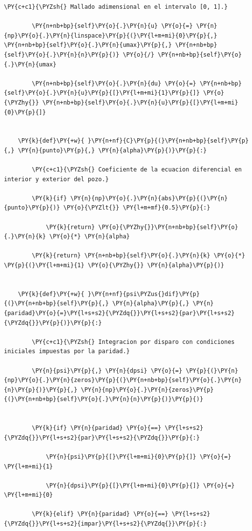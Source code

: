 \documentclass[11pt]{article}
\makeatletter
\def\PY@reset{\let\PY@it=\relax \let\PY@bf=\relax \let\PY@ul=\relax \let\PY@tc=\relax \let\PY@bc=\relax \let\PY@ff=\relax}
\def\PY@tok#1{\csname PY@tok@#1\endcsname}
\def\PY@toks#1+{\ifx\relax#1\empty\else \PY@tok{#1}\expandafter\PY@toks\fi}
\def\PY@do#1{\PY@bc{\PY@tc{\PY@ul{\PY@it{\PY@bf{\PY@ff{#1}}}}}}}
\def\PY#1#2{\PY@reset\PY@toks#1+\relax+\PY@do{#2}}
\makeatother
\begin{document}
\begin{tcolorbox}[breakable, size=fbox, boxrule=1pt, pad at break*=1mm,colback=cellbackground, colframe=cellborder]
\begin{Verbatim}[commandchars=\\\{\}]
        \PY{c+c1}{\PYZsh{} Mallado adimensional en el intervalo [0, 1].}

        \PY{n+nb+bp}{self}\PY{o}{.}\PY{n}{u} \PY{o}{=} \PY{n}{np}\PY{o}{.}\PY{n}{linspace}\PY{p}{(}\PY{l+m+mi}{0}\PY{p}{,} \PY{n+nb+bp}{self}\PY{o}{.}\PY{n}{umax}\PY{p}{,} \PY{n+nb+bp}{self}\PY{o}{.}\PY{n}{n}\PY{p}{)} \PY{o}{/} \PY{n+nb+bp}{self}\PY{o}{.}\PY{n}{umax}

        \PY{n+nb+bp}{self}\PY{o}{.}\PY{n}{du} \PY{o}{=} \PY{n+nb+bp}{self}\PY{o}{.}\PY{n}{u}\PY{p}{[}\PY{l+m+mi}{1}\PY{p}{]} \PY{o}{\PYZhy{}} \PY{n+nb+bp}{self}\PY{o}{.}\PY{n}{u}\PY{p}{[}\PY{l+m+mi}{0}\PY{p}{]}


    \PY{k}{def}\PY{+w}{ }\PY{n+nf}{C}\PY{p}{(}\PY{n+nb+bp}{self}\PY{p}{,} \PY{n}{punto}\PY{p}{,} \PY{n}{alpha}\PY{p}{)}\PY{p}{:}

        \PY{c+c1}{\PYZsh{} Coeficiente de la ecuacion diferencial en interior y exterior del pozo.}

        \PY{k}{if} \PY{n}{np}\PY{o}{.}\PY{n}{abs}\PY{p}{(}\PY{n}{punto}\PY{p}{)} \PY{o}{\PYZlt{}} \PY{l+m+mf}{0.5}\PY{p}{:}

            \PY{k}{return} \PY{o}{\PYZhy{}}\PY{n+nb+bp}{self}\PY{o}{.}\PY{n}{k} \PY{o}{*} \PY{n}{alpha}

        \PY{k}{return} \PY{n+nb+bp}{self}\PY{o}{.}\PY{n}{k} \PY{o}{*} \PY{p}{(}\PY{l+m+mi}{1} \PY{o}{\PYZhy{}} \PY{n}{alpha}\PY{p}{)}


    \PY{k}{def}\PY{+w}{ }\PY{n+nf}{psi\PYZus{}dif}\PY{p}{(}\PY{n+nb+bp}{self}\PY{p}{,} \PY{n}{alpha}\PY{p}{,} \PY{n}{paridad}\PY{o}{=}\PY{l+s+s2}{\PYZdq{}}\PY{l+s+s2}{par}\PY{l+s+s2}{\PYZdq{}}\PY{p}{)}\PY{p}{:}

        \PY{c+c1}{\PYZsh{} Integracion por disparo con condiciones iniciales impuestas por la paridad.}

        \PY{n}{psi}\PY{p}{,} \PY{n}{dpsi} \PY{o}{=} \PY{p}{(}\PY{n}{np}\PY{o}{.}\PY{n}{zeros}\PY{p}{(}\PY{n+nb+bp}{self}\PY{o}{.}\PY{n}{n}\PY{p}{)}\PY{p}{,} \PY{n}{np}\PY{o}{.}\PY{n}{zeros}\PY{p}{(}\PY{n+nb+bp}{self}\PY{o}{.}\PY{n}{n}\PY{p}{)}\PY{p}{)}


        \PY{k}{if} \PY{n}{paridad} \PY{o}{==} \PY{l+s+s2}{\PYZdq{}}\PY{l+s+s2}{par}\PY{l+s+s2}{\PYZdq{}}\PY{p}{:}

            \PY{n}{psi}\PY{p}{[}\PY{l+m+mi}{0}\PY{p}{]} \PY{o}{=} \PY{l+m+mi}{1}

            \PY{n}{dpsi}\PY{p}{[}\PY{l+m+mi}{0}\PY{p}{]} \PY{o}{=} \PY{l+m+mi}{0}

        \PY{k}{elif} \PY{n}{paridad} \PY{o}{==} \PY{l+s+s2}{\PYZdq{}}\PY{l+s+s2}{impar}\PY{l+s+s2}{\PYZdq{}}\PY{p}{:}


\end{Verbatim}
\end{tcolorbox}
\end{document}
